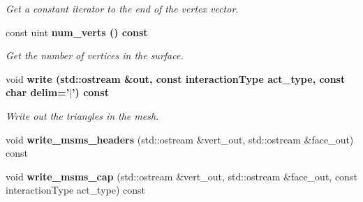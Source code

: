 \begin{CompactItemize}
\begin{CompactList}\small\item\em Get a constant iterator to the end of the vertex vector. \item\end{CompactList}\item 
const uint \bf{num\_\-verts} () const \label{classASCbase_1_1geometry_1_1TriMeshSphere_8835cfe88ab71442635ab7d5f05c4767}

\begin{CompactList}\small\item\em Get the number of vertices in the surface. \item\end{CompactList}\item 
void \bf{write} (std::ostream \&out, const interaction\-Type act\_\-type, const char delim='$|$') const \label{classASCbase_1_1geometry_1_1TriMeshSphere_dd30e7e90a9f41be6d54de06cba3d0f0}

\begin{CompactList}\small\item\em Write out the triangles in the mesh. \item\end{CompactList}\item 
void \textbf{write\_\-msms\_\-headers} (std::ostream \&vert\_\-out, std::ostream \&face\_\-out) const \label{classASCbase_1_1geometry_1_1TriMeshSphere_b3552eec82a823e41ef9ed70504b7368}

\item 
void \textbf{write\_\-msms\_\-cap} (std::ostream \&vert\_\-out, std::ostream \&face\_\-out, const interaction\-Type act\_\-type) const \label{classASCbase_1_1geometry_1_1TriMeshSphere_3772f4f815c191e7fe24cca03e8f96e9}

\end{CompactItemize}
